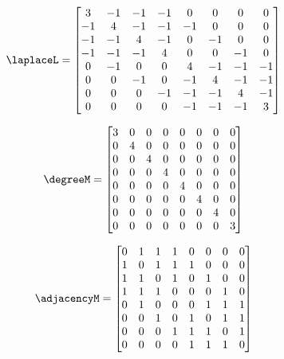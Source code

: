 \begin{equation}
\laplaceL =
\begin{bmatrix}
3 & -1 & -1 & -1 & 0 & 0 & 0 & 0 \\
-1 &  4 & -1 & -1 & -1 & 0 & 0 & 0 \\
-1 & -1 &  4 & -1 & 0 & -1 & 0 & 0 \\
-1 & -1 & -1 &  4 & 0 & 0 & -1 & 0 \\
0 & -1 & 0 & 0 &  4 & -1 & -1 & -1 \\
0 & 0 & -1 & 0 & -1 &  4 & -1 & -1 \\
0 & 0 & 0 & -1 & -1 & -1 &  4 & -1 \\
0 & 0 & 0 & 0 & -1 & -1 & -1 &  3
\end{bmatrix}
\end{equation}

\begin{equation}
\degreeM =
\begin{bmatrix}
3 & 0 & 0 & 0 & 0 & 0 & 0 & 0 \\
0 & 4 & 0 & 0 & 0 & 0 & 0 & 0 \\
0 & 0 & 4 & 0 & 0 & 0 & 0 & 0 \\
0 & 0 & 0 & 4 & 0 & 0 & 0 & 0 \\
0 & 0 & 0 & 0 & 4 & 0 & 0 & 0 \\
0 & 0 & 0 & 0 & 0 & 4 & 0 & 0 \\
0 & 0 & 0 & 0 & 0 & 0 & 4 & 0 \\
0 & 0 & 0 & 0 & 0 & 0 & 0 & 3
\end{bmatrix}
\end{equation}

\begin{equation}
\adjacencyM =
\begin{bmatrix}
0 & 1 & 1 & 1 & 0 & 0 & 0 & 0 \\
1 & 0 & 1 & 1 & 1 & 0 & 0 & 0 \\
1 & 1 & 0 & 1 & 0 & 1 & 0 & 0 \\
1 & 1 & 1 & 0 & 0 & 0 & 1 & 0 \\
0 & 1 & 0 & 0 & 0 & 1 & 1 & 1 \\
0 & 0 & 1 & 0 & 1 & 0 & 1 & 1 \\
0 & 0 & 0 & 1 & 1 & 1 & 0 & 1 \\
0 & 0 & 0 & 0 & 1 & 1 & 1 & 0
\end{bmatrix}
\end{equation}

